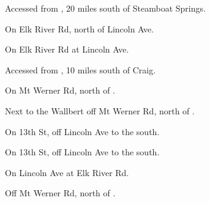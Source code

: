 

\begin{LocationList}

Accessed from , 20 miles south of Steamboat Springs.

\Location{\GarageHQ \Garage}
On Elk River Rd, north of  Lincoln Ave.

\Location{\GasStation \Gas}
On Elk River Rd at  Lincoln Ave.

Accessed from , 10 miles south of Craig.

On Mt Werner Rd, north of .

\Location{\RestArea \Rest}
Next to the Wallbert off Mt Werner Rd, north of .

On 13th St, off  Lincoln Ave to the south.

\Location{\TruckService \Service}
On 13th St, off  Lincoln Ave to the south.

On  Lincoln Ave at Elk River Rd.

Off Mt Werner Rd, north of .

\end{LocationList}
